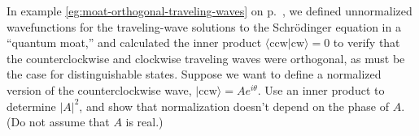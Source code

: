 In example \ref{eg:moat-orthogonal-traveling-waves} on p.~\pageref{eg:moat-orthogonal-traveling-waves},
we defined unnormalized wavefunctions for the traveling-wave solutions to the Schr\"odinger equation
in a ``quantum moat,'' and calculated the inner product
$\langle \text{ccw} | \text{cw} \rangle=0$ to verify that the counterclockwise and clockwise
traveling waves were orthogonal, as must be the case for distinguishable states.
Suppose we want to define a normalized version of the counterclockwise wave,
$|\text{ccw}\rangle=Ae^{i\theta}$. Use an inner product to determine $|A|^2$, and show that
normalization doesn't depend on the phase of $A$. (Do not assume that $A$ is real.)\answercheck
